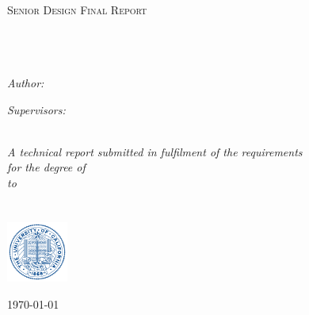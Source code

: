 \documentclass[11pt, oneside]{Thesis} %
\begin{document}
\begin{titlepage}
\begin{center}

\textsc{\LARGE \univname}\\[1.5cm] %
\textsc{\Large Senior Design Final Report }\\[0.5cm] %

\HRule \\[0.4cm] %
{\huge \bfseries \ttitle}\\[0.4cm] %
\HRule \\[1.5cm] %
 
\begin{minipage}{0.4\textwidth}
\begin{flushleft} \large
\emph{Author:}\\
\href{http://www.empireryan.com}{\authornames} %
\end{flushleft}
\end{minipage}
\begin{minipage}{0.4\textwidth}
\begin{flushright} \large
\emph{Supervisors:} \\
{\supname} %
\end{flushright}
\end{minipage}\\[3cm]
 
\large \textit{A technical report submitted in fulfilment of the requirements\\ for the degree of \degreename}\\[0.3cm] %
\textit{to}\\[0.4cm]
\groupname\\\deptname\\[2cm] %
\includegraphics[width=0.15\textwidth]{seal} %

{\large \today}\\[4cm] %
 
\vfill
\end{center}

\end{titlepage}
\end{document}

